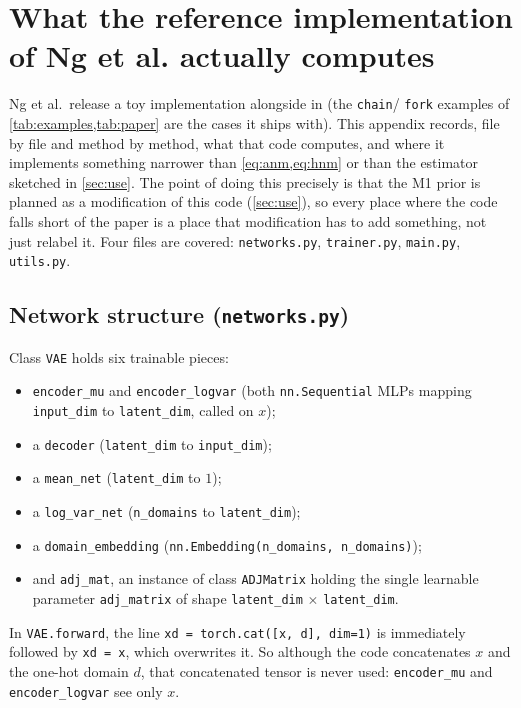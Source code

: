 \section{What the reference implementation of Ng et al. actually computes}
\label{app:code}

Ng et al.\ release a toy implementation alongside \cite{ng2025} in \cite{ngimpl} (the \texttt{chain}/
\texttt{fork} examples
of \cref{tab:examples,tab:paper} are the cases it ships with). This appendix records, file by file and
method by method, what that code computes, and where it implements something narrower than
\cref{eq:anm,eq:hnm} or than the estimator sketched in \cref{sec:use}. The point of doing this precisely 
is that the M1 prior is planned as a modification of this code (\cref{sec:use}), so every place where 
the code falls short of the paper is a place that modification has to add something, not just relabel 
it. Four files are covered: \texttt{networks.py}, \texttt{trainer.py}, \texttt{main.py}, 
\texttt{utils.py}.

\subsection{Network structure (\texttt{networks.py})}
Class \texttt{VAE} holds six trainable pieces:
\begin{itemize}[noitemsep,label={-}]
\item \texttt{encoder\_mu} and \texttt{encoder\_logvar} (both
\texttt{nn.Sequential} MLPs mapping \texttt{input\_dim} to \linebreak \texttt{latent\_dim}, 
called on $x$);
\item a \texttt{decoder} (\texttt{latent\_dim} to \texttt{input\_dim});
\item a \texttt{mean\_net} (\texttt{latent\_dim} to $1$);
\item a \texttt{log\_var\_net} (\texttt{n\_domains} to \texttt{latent\_dim});
\item a \texttt{domain\_embedding} (\texttt{nn.Embedding(n\_domains, n\_domains)});
\item and \texttt{adj\_mat}, an instance of class \texttt{ADJMatrix} holding the single learnable parameter \linebreak \texttt{adj\_matrix} of shape \texttt{latent\_dim}$\,\times\,$\texttt{latent\_dim}.
\end{itemize}

In \texttt{VAE.forward}, the line \texttt{xd = torch.cat([x, d], dim=1)} is immediately followed by
\texttt{xd = x}, which overwrites it. So although the code concatenates $x$ and the one-hot domain $d$,
that concatenated tensor is never used: \texttt{encoder\_mu} and \texttt{encoder\_logvar} see only $x$.

